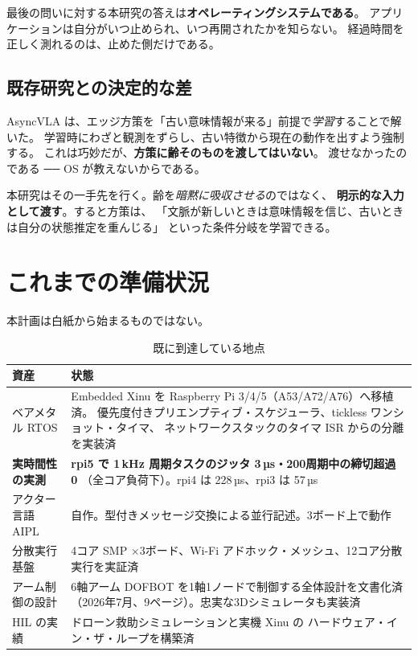 \documentclass[11pt,a4paper]{article}
\newcommand{\prob}[1]{\textbf{\textcolor{red!55!black}{#1}}}
\newcommand{\keyp}[1]{\textbf{\textcolor{blue!45!black}{#1}}}
\begin{document}
\noindent
最後の問いに対する本研究の答えは\keyp{オペレーティングシステムである}。
アプリケーションは自分がいつ止められ、いつ再開されたかを知らない。
経過時間を正しく測れるのは、止めた側だけである。

\subsection{既存研究との決定的な差}

AsyncVLA は、エッジ方策を「古い意味情報が来る」前提で\emph{学習}することで解いた。
学習時にわざと観測をずらし、古い特徴から現在の動作を出すよう強制する。
これは巧妙だが、\prob{方策に齢そのものを渡してはいない}。
渡せなかったのである ── OS が教えないからである。

本研究はその一手先を行く。齢を\emph{暗黙に吸収させる}のではなく、
\keyp{明示的な入力として渡す}。すると方策は、
「文脈が新しいときは意味情報を信じ、古いときは自分の状態推定を重んじる」
といった条件分岐を学習できる。

\section{これまでの準備状況}

本計画は白紙から始まるものではない。

\begin{table}[htbp]
\centering
\small
\caption{既に到達している地点}
\begin{tabularx}{\textwidth}{@{}l X@{}}
\toprule
\textbf{資産} & \textbf{状態} \\
\midrule
ベアメタル RTOS & Embedded Xinu を Raspberry Pi 3/4/5（A53/A72/A76）へ移植済。
  優先度付きプリエンプティブ・スケジューラ、tickless ワンショット・タイマ、
  ネットワークスタックのタイマ ISR からの分離を実装済 \\
\keyp{実時間性の実測} & \keyp{rpi5 で 1\,kHz 周期タスクのジッタ 3\,µs・200周期中の締切超過 0}
  （全コア負荷下）。rpi4 は 228\,µs、rpi3 は 57\,µs \\
アクター言語 AIPL & 自作。型付きメッセージ交換による並行記述。3ボード上で動作 \\
分散実行基盤 & 4コア SMP ×3ボード、Wi-Fi アドホック・メッシュ、12コア分散実行を実証済 \\
アーム制御の設計 & 6軸アーム DOFBOT を1軸1ノードで制御する全体設計を文書化済
  （2026年7月、9ページ）。忠実な3Dシミュレータも実装済 \\
HIL の実績 & ドローン救助シミュレーションと実機 Xinu の
  ハードウェア・イン・ザ・ループを構築済 \\
\bottomrule
\end{tabularx}
\end{table}
\end{document}
